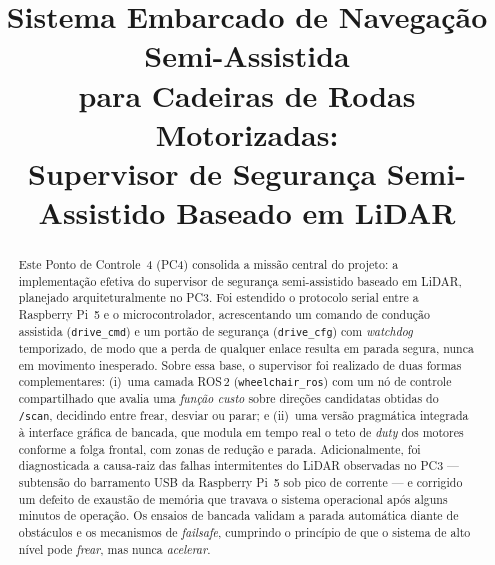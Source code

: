 \documentclass[conference]{IEEEtran}
\begin{document}
\title{Sistema Embarcado de Navegação Semi-Assistida\\
para Cadeiras de Rodas Motorizadas:\\
Supervisor de Segurança Semi-Assistido Baseado em LiDAR}

\author{
\and
{}
}

\maketitle

\begin{abstract}
Este Ponto de Controle~4 (PC4) consolida a missão central do projeto: a
implementação efetiva do supervisor de segurança semi-assistido baseado em
LiDAR, planejado arquiteturalmente no PC3. Foi estendido o protocolo serial
entre a Raspberry Pi~5 e o microcontrolador, acrescentando um comando de
condução assistida (\texttt{drive\_cmd}) e um portão de segurança
(\texttt{drive\_cfg}) com \emph{watchdog} temporizado, de modo que a perda de
qualquer enlace resulta em parada segura, nunca em movimento inesperado. Sobre
essa base, o supervisor foi realizado de duas formas complementares: (i)~uma
camada ROS\,2 (\texttt{wheelchair\_ros}) com um nó de controle compartilhado
que avalia uma \emph{função custo} sobre direções candidatas obtidas do
\texttt{/scan}, decidindo entre frear, desviar ou parar; e (ii)~uma versão
pragmática integrada à interface gráfica de bancada, que modula em tempo real
o teto de \emph{duty} dos motores conforme a folga frontal, com zonas de
redução e parada. Adicionalmente, foi diagnosticada a causa-raiz das falhas
intermitentes do LiDAR observadas no PC3 --- subtensão do barramento USB da
Raspberry Pi~5 sob pico de corrente --- e corrigido um defeito de exaustão de
memória que travava o sistema operacional após alguns minutos de operação. Os
ensaios de bancada validam a parada automática diante de obstáculos e os
mecanismos de \emph{failsafe}, cumprindo o princípio de que o sistema de alto
nível pode \emph{frear}, mas nunca \emph{acelerar}.
\end{abstract}
\end{document}
